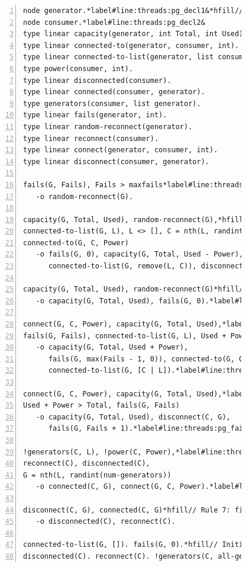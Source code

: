 \begin{figure}[h!]
\begin{Verbatim}[numbers=left,fontsize=\codesize,commandchars=*\#\&]
node generator.*label#line:threads:pg_decl1&*hfill// Type declaration
node consumer.*label#line:threads:pg_decl2&
type linear capacity(generator, int Total, int Used).*hfill// Predicate declaration
type linear connected-to(generator, consumer, int).
type linear connected-to-list(generator, list consumer).
type power(consumer, int).
type linear disconnected(consumer).
type linear connected(consumer, generator).
type generators(consumer, list generator).
type linear fails(generator, int).
type linear random-reconnect(generator).
type linear reconnect(consumer).
type linear connect(generator, consumer, int).
type linear disconnect(consumer, generator).

fails(G, Fails), Fails > maxfails*label#line:threads:pg_recon1&*hfill// Rule 1: disconnect one consumer
   -o random-reconnect(G).

capacity(G, Total, Used), random-reconnect(G),*hfill// Rule 2: disconnect one consumer
connected-to-list(G, L), L <> [], C = nth(L, randint(length(L))),
connected-to(G, C, Power)
   -o fails(G, 0), capacity(G, Total, Used - Power),
      connected-to-list(G, remove(L, C)), disconnect(C, G).

capacity(G, Total, Used), random-reconnect(G)*hfill// Rule 3: unable to disconnect one consumer
   -o capacity(G, Total, Used), fails(G, 0).*label#line:threads:pg_recon2&

connect(G, C, Power), capacity(G, Total, Used),*label#line:threads:pg_gen1&*hfill// Rule 4: connect consumer
fails(G, Fails), connected-to-list(G, L), Used + Power <= Total
   -o capacity(G, Total, Used + Power),
      fails(G, max(Fails - 1, 0)), connected-to(G, C, Power),
      connected-to-list(G, [C | L]).*label#line:threads:pg_gen2&

connect(G, C, Power), capacity(G, Total, Used),*label#line:threads:pg_fail1&*hfill// Rule 5: unable to connect consumer
Used + Power > Total, fails(G, Fails)
   -o capacity(G, Total, Used), disconnect(C, G),
      fails(G, Fails + 1).*label#line:threads:pg_fail2&

!generators(C, L), !power(C, Power),*label#line:threads:pg_connect1&*hfill// Rule 6: connect to a generator
reconnect(C), disconnected(C),
G = nth(L, randint(num-generators))
   -o connected(C, G), connect(G, C, Power).*label#line:threads:pg_connect2&

disconnect(C, G), connected(C, G)*hfill// Rule 7: finish disconnection
   -o disconnected(C), reconnect(C).

connected-to-list(G, []). fails(G, 0).*hfill// Initial facts
disconnected(C). reconnect(C). !generators(C, all-generators).
\end{Verbatim}
\label{code:threads:powergrid}
\end{figure}

